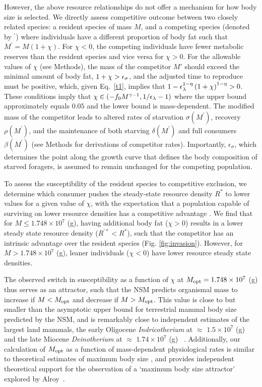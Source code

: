 \documentclass[twocolumn,preprintnumbers,amsmath,amssymb,superscriptaddress]{revtex4}
\begin{document}
However, the above resource relationships do not offer a mechanism for how
body size is selected.  We directly assess competitive outcome between two
closely related species: a resident species of mass $M$, and a competing
species (denoted by $^\prime$) where individuals have a different proportion
of body fat such that $M^\prime=M(1+\chi)$.  For $\chi < 0$, the competing
individuals have fewer metabolic reserves than the resident species and vice
versa for $\chi>0$.  For the allowable values of $\chi$ (see Methods), the mass of
the competitor $M'$ should exceed the minimal amount of body fat,
$1+\chi>\epsilon_{\rm \sigma}$, and the adjusted time to reproduce must be
positive, which, given Eq.~\ref{t1}, implies that
$1-\epsilon_{\rm \lambda}^{1-\eta}\left(1+\chi\right)^{1-\eta}>0$.  These
conditions imply that $\chi\in(-f_0M^{\gamma-1},1/\epsilon_{\rm \lambda}-1)$
where the upper bound approximately equals $0.05$ and the lower bound is
mass-dependent.  The modified mass of the competitor leads to altered rates
of starvation $\sigma(M^\prime)$, recovery $\rho(M^\prime)$, and the
maintenance of both starving $\delta(M^\prime)$ and full consumers
$\beta(M^\prime)$ (see Methods for derivations of competitor rates).
Importantly, $\epsilon_\sigma$, which determines the point along the growth
curve that defines the body composition of starved foragers, is assumed to
remain unchanged for the competing population.


To assess the susceptibility of the resident species to competitive
exclusion, we determine which consumer pushes the steady-state resource
density $R^*$ to lower values for a given value of $\chi$, with the
expectation that a population capable of surviving on lower resource
densities has a competitive advantage \citep{tilman1981}.  We find that for
$M\leq 1.748\times10^7$ (g), having additional body fat ($\chi > 0$) results
in a lower steady state resource density ($R^{\prime *}<R^*$), such that the
competitor has an intrinsic advantage over the resident species
(Fig. \ref{fig:invasion}).  However, for $M> 1.748\times10^7$ (g), leaner
individuals ($\chi < 0$) have lower resource steady state densities.



The observed switch in susceptibility as a function of $\chi$ at
$M_{\rm \rm opt}= 1.748\times10^7$ (g) thus serves as an attractor, such that the
NSM predicts organismal mass to increase if $M<M_{\rm \rm opt}$ and decrease if
$M>M_{\rm \rm opt}$.  This value is close to but smaller than the asymptotic
upper bound for terrestrial mammal body size predicted by the NSM, and is remarkably close to independent estimates of the largest land
mammals, the early Oligocene \emph{Indricotherium} at $\approx$
$1.5\times10^7$ (g) and the late Miocene \emph{Deinotherium} at $\approx$
$1.74\times10^7$ (g) ~\citep{Smith:2010p3442}.  Additionally, our calculation
of $M_{\rm \rm opt}$ as a function of mass-dependent physiological rates is
similar to theoretical estimates of maximum body size \citep{Clauset:2009fh},
and provides independent theoretical support for the observation of a
`maximum body size attractor' explored by Alroy~\citep{Alroy:1998p1594}.
\end{document}

